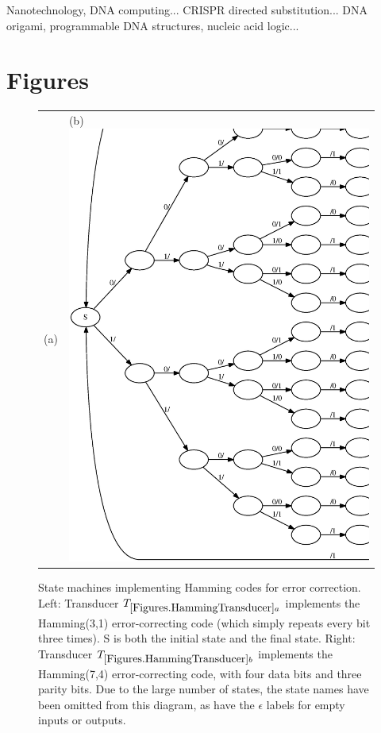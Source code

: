 \documentclass[english]{article}
\begin{document}
Nanotechnology, DNA computing...
CRISPR directed substitution...
DNA origami, programmable DNA structures, nucleic acid logic...


\newpage
\section{Figures}

\newpage
\begin{figure}
\begin{tabular}{ll}
(a) {hamming31}{width=.45\textwidth}
&
(b) \includegraphics[width=.45\textwidth]{hamming74.ps}
\end{tabular}
\caption{ 
State machines implementing Hamming codes for error correction.
Left:
Transducer $\hammingthreeone$ implements the Hamming(3,1) error-correcting code
(which simply repeats every bit three times).
S is both the initial state and the final state.
Right:
Transducer $\hammingsevenfour$ implements the Hamming(7,4) error-correcting code,
with four data bits and three parity bits.
Due to the large number of states, the state names have been omitted from this diagram,
as have the $\epsilon$ labels for empty inputs or outputs.
}
\end{figure}

\newpage
{}
\end{document}
